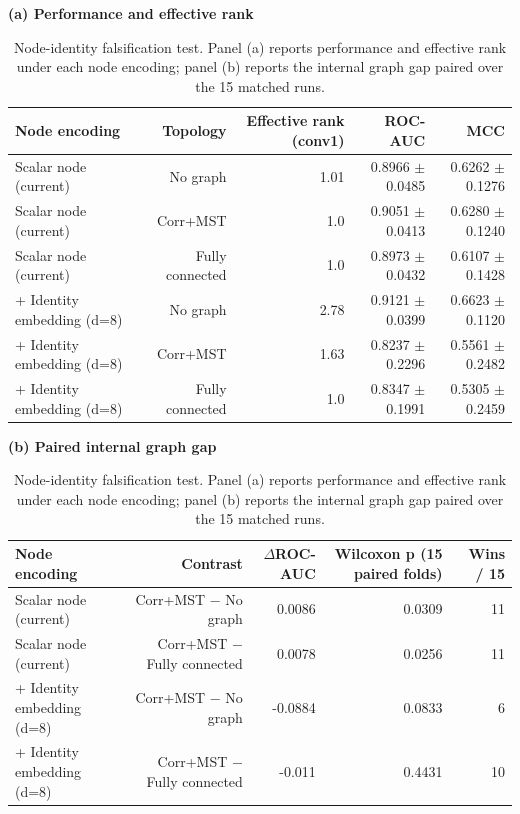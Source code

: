 \begin{table}[t]
\centering
\caption{Node-identity falsification test. Panel (a) reports performance and effective rank under each node encoding; panel (b) reports the internal graph gap paired over the 15 matched runs.}
\label{tab:nodeid}
\label{tab:nodeidgap}
\footnotesize
\textbf{(a) Performance and effective rank}\\[2pt]
\begin{tabular}{lrrrr}
\toprule
Node encoding & Topology & Effective rank (conv1) & ROC-AUC & MCC \\
\midrule
Scalar node (current) & No graph & 1.01 & 0.8966 $\pm$ 0.0485 & 0.6262 $\pm$ 0.1276 \\
Scalar node (current) & Corr+MST & 1.0 & 0.9051 $\pm$ 0.0413 & 0.6280 $\pm$ 0.1240 \\
Scalar node (current) & Fully connected & 1.0 & 0.8973 $\pm$ 0.0432 & 0.6107 $\pm$ 0.1428 \\
+ Identity embedding (d=8) & No graph & 2.78 & 0.9121 $\pm$ 0.0399 & 0.6623 $\pm$ 0.1120 \\
+ Identity embedding (d=8) & Corr+MST & 1.63 & 0.8237 $\pm$ 0.2296 & 0.5561 $\pm$ 0.2482 \\
+ Identity embedding (d=8) & Fully connected & 1.0 & 0.8347 $\pm$ 0.1991 & 0.5305 $\pm$ 0.2459 \\
\bottomrule
\end{tabular}
\vspace{7pt}
\textbf{(b) Paired internal graph gap}\\[2pt]
\begin{tabular}{lrrrr}
\toprule
Node encoding & Contrast & $\Delta$ROC-AUC & Wilcoxon p (15 paired folds) & Wins / 15 \\
\midrule
Scalar node (current) & Corr+MST $-$ No graph & 0.0086 & 0.0309 & 11 \\
Scalar node (current) & Corr+MST $-$ Fully connected & 0.0078 & 0.0256 & 11 \\
+ Identity embedding (d=8) & Corr+MST $-$ No graph & -0.0884 & 0.0833 & 6 \\
+ Identity embedding (d=8) & Corr+MST $-$ Fully connected & -0.011 & 0.4431 & 10 \\
\bottomrule
\end{tabular}
\end{table}
